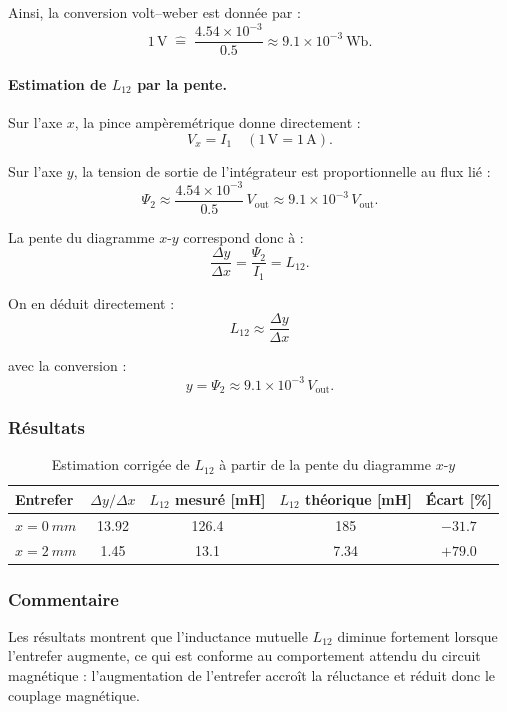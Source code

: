 Ainsi, la conversion volt--weber est donnée par :
\[
1\,\mathrm{V} \;\widehat{=}\; \frac{4.54 \times 10^{-3}}{0.5}
\approx 9.1 \times 10^{-3}\ \mathrm{Wb}.
\]

\paragraph{Estimation de \(L_{12}\) par la pente.}
Sur l’axe \(x\), la pince ampèremétrique donne directement :
\[
V_x = I_1 \quad (1\,\mathrm{V} = 1\,\mathrm{A}).
\]

Sur l’axe \(y\), la tension de sortie de l’intégrateur est proportionnelle au flux lié :
\[
\Psi_2 \approx \frac{4.54\times10^{-3}}{0.5}\, V_{\mathrm{out}}
\approx 9.1\times10^{-3}\, V_{\mathrm{out}}.
\]

La pente du diagramme \(x\)-\(y\) correspond donc à :
\[
\frac{\Delta y}{\Delta x}
=
\frac{\Psi_2}{I_1}
= L_{12}.
\]

On en déduit directement :
\[
\boxed{
L_{12} \approx \frac{\Delta y}{\Delta x}
}
\]

avec la conversion :
\[
y = \Psi_2 \approx 9.1\times10^{-3}\, V_{\mathrm{out}}.
\]

\subsubsection{Résultats}
\begin{table}[H]
\centering
\caption{Estimation corrigée de \(L_{12}\) à partir de la pente du diagramme \(x\)-\(y\)}
\begin{tabular}{lcccc}
\toprule
Entrefer & \(\Delta y/\Delta x\) & \(L_{12}\) mesuré [mH] & \(L_{12}\) théorique [mH] & Écart [\%] \\
\midrule
\(x=\SI{0}{mm}\) & 13.92 & 126.4 & 185 & \(-31.7\) \\
\(x=\SI{2}{mm}\) & 1.45  & 13.1  & 7.34 & \(+79.0\) \\
\bottomrule
\end{tabular}
\label{tab:L12_mes_corr}
\end{table}

\subsubsection{Commentaire}
Les résultats montrent que l’inductance mutuelle \(L_{12}\) diminue fortement lorsque l’entrefer augmente, ce qui est conforme au comportement attendu du circuit magnétique : l’augmentation de l’entrefer accroît la réluctance et réduit donc le couplage magnétique.

